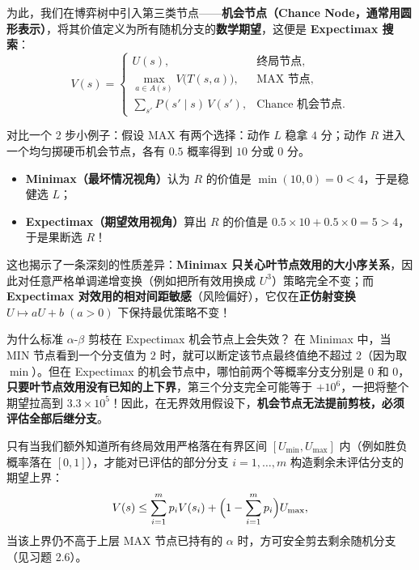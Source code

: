 为此，我们在博弈树中引入第三类节点——\textbf{机会节点（Chance Node，通常用圆形表示）}，将其价值定义为所有随机分支的\textbf{数学期望}，这便是 \textbf{Expectimax 搜索}：
\begin{equation}\label{eq:expectimax}
  V(s) =
  \begin{cases}
    U(s), & \text{终局节点}, \\[4pt]
    \displaystyle\max_{a \in A(s)} V\bigl(T(s,a)\bigr), & \text{MAX 节点}, \\[8pt]
    \displaystyle\sum_{s'} P(s'\mid s)\, V(s'), & \text{Chance 机会节点}.
  \end{cases}
\end{equation}

对比一个 2 步小例子：假设 \textsf{MAX} 有两个选择：动作 $L$ 稳拿 $4$ 分；动作 $R$ 进入一个均匀掷硬币机会节点，各有 $0.5$ 概率得到 $10$ 分或 $0$ 分。
\begin{itemize}
  \item \textbf{Minimax（最坏情况视角）}认为 $R$ 的价值是 $\min(10, 0) = 0 < 4$，于是稳健选 $L$；
  \item \textbf{Expectimax（期望效用视角）}算出 $R$ 的价值是 $0.5\times 10 + 0.5\times 0 = 5 > 4$，于是果断选 $R$！
\end{itemize}
这也揭示了一条深刻的性质差异：\textbf{Minimax 只关心叶节点效用的大小序关系}，因此对任意严格单调递增变换（例如把所有效用换成 $U^3$）策略完全不变；而 \textbf{Expectimax 对效用的相对间距敏感}（风险偏好），它仅在\textbf{正仿射变换} $U \mapsto aU + b\;(a>0)$ 下保持最优策略不变！

\begin{failBox}{为什么标准 $\alpha$-$\beta$ 剪枝在 Expectimax 机会节点上会失效？}
在 Minimax 中，当 \textsf{MIN} 节点看到一个分支值为 $2$ 时，就可以断定该节点最终值绝不超过 $2$（因为取 $\min$）。但在 Expectimax 的机会节点中，哪怕前两个等概率分支分别是 $0$ 和 $0$，\textbf{只要叶节点效用没有已知的上下界}，第三个分支完全可能等于 $+10^6$，一把将整个期望拉高到 $3.3\times 10^5$！因此，在无界效用假设下，\textbf{机会节点无法提前剪枝，必须评估全部后继分支}。

只有当我们额外知道所有终局效用严格落在有界区间 $[U_{\min}, U_{\max}]$ 内（例如胜负概率落在 $[0, 1]$），才能对已评估的部分分支 $i=1,\dots,m$ 构造剩余未评估分支的期望上界：
\[
  V(s) \le \sum_{i=1}^{m} p_i V(s_i) + \Bigl(1 - \sum_{i=1}^{m} p_i\Bigr) U_{\max},
\]
当该上界仍不高于上层 \textsf{MAX} 节点已持有的 $\alpha$ 时，方可安全剪去剩余随机分支（见习题 2.6）。
\end{failBox}

